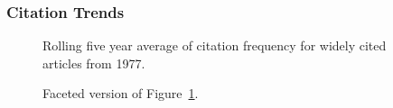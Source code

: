 \documentclass[
  10pt,
  letterpaper,
  DIV=11,
  numbers=noendperiod,
  twoside]{scrartcl}
\begin{document}
\subsubsection*{Citation Trends}\label{sec-trends-1977}

\begin{figure}


\caption{\label{fig-citation-spaghetti-1977}Rolling five year average of
citation frequency for widely cited articles from 1977.}

\end{figure}%

\begin{figure}


\caption{\label{fig-citation-facet-1977}Faceted version of
Figure~\ref{fig-citation-spaghetti-1977}.}

\end{figure}%
\end{document}
